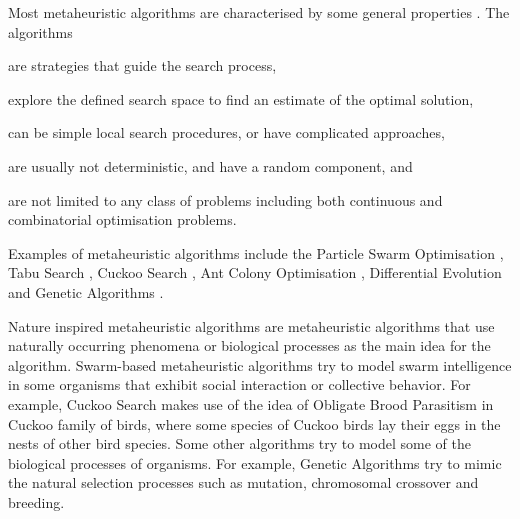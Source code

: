 \documentclass[12pt]{article}
\theoremstyle{definition}
\begin{document}
Most metaheuristic algorithms are characterised by some general properties \cite{BlumRoli2001}. The algorithms
\begin{enumerate*}[(i)]
    \item are strategies that guide the search process,
    \item explore the defined search space to find an estimate of the optimal solution,
    \item can be simple local search procedures, or have complicated approaches,
    \item are usually not deterministic, and have a random component, and
    \item are not limited to any class of problems including both continuous and combinatorial optimisation problems.
\end{enumerate*}
Examples of metaheuristic algorithms include the Particle Swarm Optimisation \cite{kennedy95particle}, Tabu Search \cite{doi:10.1287/ijoc.1.3.190, doi:10.1287/ijoc.2.1.4}, Cuckoo Search \cite{yangdeb2009}, Ant Colony Optimisation \cite{dorigo1996}, Differential Evolution \cite{Storn1997} and Genetic Algorithms \cite{holland1992}. \newline

Nature inspired metaheuristic algorithms are metaheuristic algorithms that use naturally occurring phenomena or biological processes as the main idea for the algorithm. Swarm-based metaheuristic algorithms try to model swarm intelligence in some organisms that exhibit social interaction or collective behavior. For example, Cuckoo Search makes use of the idea of Obligate Brood Parasitism in Cuckoo family of birds, where some species of Cuckoo birds lay their eggs in the nests of other bird species. Some other algorithms try to model some of the biological processes of organisms. For example, Genetic Algorithms try to mimic the natural selection processes such as mutation, chromosomal crossover and breeding.

\end{document}

